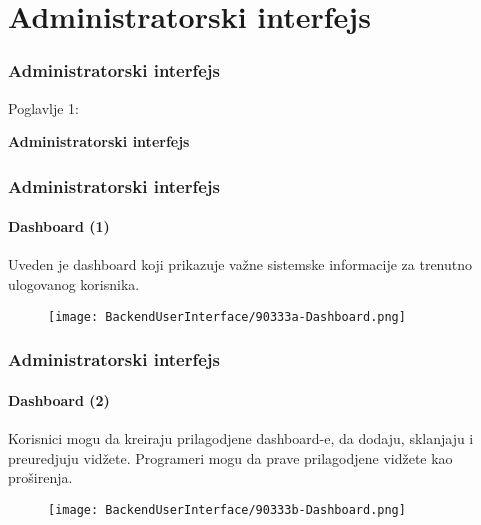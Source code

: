 %

\section{Administratorski interfejs}
\begin{frame}[fragile]
	\frametitle{Administratorski interfejs}

	\begin{center}\huge{Poglavlje 1:}\end{center}
	\begin{center}\huge{\color{typo3darkgrey}\textbf{Administratorski interfejs}}\end{center}

\end{frame}


\begin{frame}[fragile]
	\frametitle{Administratorski interfejs}
	\framesubtitle{Dashboard (1)}


	Uveden je dashboard koji prikazuje važne sistemske informacije za
	trenutno ulogovanog korisnika.

	\begin{figure}
		\texttt{[image: BackendUserInterface/90333a-Dashboard.png]}
	\end{figure}

\end{frame}


\begin{frame}[fragile]
	\frametitle{Administratorski interfejs}
	\framesubtitle{Dashboard (2)}

	Korisnici mogu da kreiraju prilagodjene dashboard-e, da dodaju, sklanjaju i
	preuredjuju vidžete. Programeri mogu da prave prilagodjene vidžete kao proširenja.

	\begin{figure}
		\texttt{[image: BackendUserInterface/90333b-Dashboard.png]}
	\end{figure}

\end{frame}

